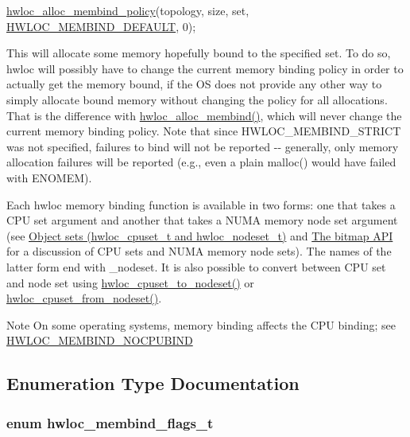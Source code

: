 \begin{DoxyCode}
 \hyperlink{a00059_ga6178c6a9ec1dd88ec9f6a9fcdcc7d634}{hwloc_alloc_membind_policy}(topology, size, \textcolor{keyword}{set}, 
                            \hyperlink{a00050_ggac9764f79505775d06407b40f5e4661e8a18675bb80ebc1bce5b652e9de8f3998c}{HWLOC_MEMBIND_DEFAULT}, 0);
\end{DoxyCode}


This will allocate some memory hopefully bound to the specified set. To do so, hwloc will possibly have to change the current memory binding policy in order to actually get the memory bound, if the OS does not provide any other way to simply allocate bound memory without changing the policy for all allocations. That is the difference with \hyperlink{a00050_ga221a7edc5d436300374fa16463f607e5}{hwloc\_\-alloc\_\-membind()}, which will never change the current memory binding policy. Note that since HWLOC\_\-MEMBIND\_\-STRICT was not specified, failures to bind will not be reported -\/-\/ generally, only memory allocation failures will be reported (e.g., even a plain malloc() would have failed with ENOMEM).

Each hwloc memory binding function is available in two forms: one that takes a CPU set argument and another that takes a NUMA memory node set argument (see \hyperlink{a00040}{Object sets (hwloc\_\-cpuset\_\-t and hwloc\_\-nodeset\_\-t)} and \hyperlink{a00065}{The bitmap API} for a discussion of CPU sets and NUMA memory node sets). The names of the latter form end with \_\-nodeset. It is also possible to convert between CPU set and node set using \hyperlink{a00062_ga60ecc4ae480c28b5fbd34aca4fc37daa}{hwloc\_\-cpuset\_\-to\_\-nodeset()} or \hyperlink{a00062_gaa677fd588304b5615de4ea78104adfb5}{hwloc\_\-cpuset\_\-from\_\-nodeset()}.

\begin{DoxyNote}{Note}
On some operating systems, memory binding affects the CPU binding; see \hyperlink{a00050_ggab00475fd98815bf4fb9aaf752030e7d2aad6b9eaf2ee324ca58dc8f58094b9997}{HWLOC\_\-MEMBIND\_\-NOCPUBIND} 
\end{DoxyNote}


\subsection{Enumeration Type Documentation}
\hypertarget{a00050_gab00475fd98815bf4fb9aaf752030e7d2}{
\subsubsection[{hwloc\_\-membind\_\-flags\_\-t}]{\setlength{\rightskip}{0pt plus 5cm}enum {\bf hwloc\_\-membind\_\-flags\_\-t}}}
\label{a00050_gab00475fd98815bf4fb9aaf752030e7d2}


